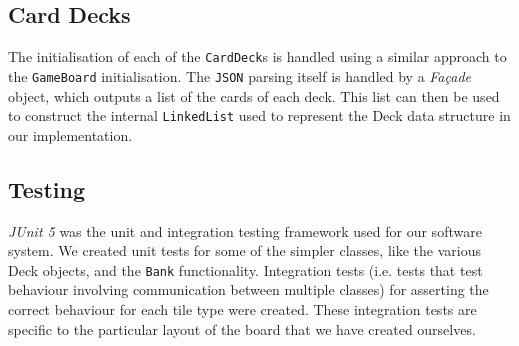 \documentclass[a4paper, 11pt]{article}
\begin{document}
	\subsection*{Card Decks}
	The initialisation of each of the \texttt{CardDeck}s is handled using a similar approach to the \texttt{GameBoard} initialisation. The \texttt{JSON} parsing itself is handled by a \textit{Fa\c{c}ade} object, which outputs a list of the cards of each deck. This list can then be used to construct the internal \texttt{LinkedList} used to represent the Deck data structure in our implementation.
	
	\subsection*{Testing}
	\textit{JUnit 5} was the unit and integration testing framework used for our software system. We created unit tests for some of the simpler classes, like the various Deck objects, and the \texttt{Bank} functionality.
	Integration tests (i.e. tests that test behaviour involving communication between multiple classes) for asserting the correct behaviour for each tile type were created. These integration tests are specific to the particular layout of the board that we have created ourselves.
	
	
\end{document}
